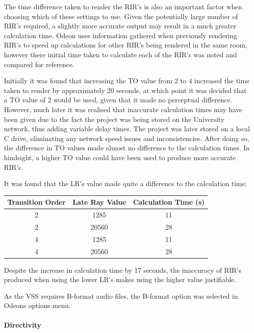 \documentclass[../../main.tex]{subfiles}
\begin{document}
				The time difference taken to render the \ac{RIR}'s is also an important factor when choosing which of these settings to use. Given the potentially large number of \ac{RIR}'s required, a slightly more accurate output may result in a much greater calculation time. Odeon uses information gathered when previously rendering \ac{RIR}'s to speed up calculations for other \ac{RIR}'s being rendered in the same room, however there initial time taken to calculate each of the \ac{RIR}'s was noted and compared for reference.

				Initially it was found that increasing the \ac{TO} value from 2 to 4 increased the time taken to render by approximately 20 seconds, at which point it was decided that a \ac{TO} value of 2 would be used, given that it made no perceptual difference. However, much later it was realised that inaccurate calculation times may have been given due to the fact the project was being stored on the University network, thus adding variable delay times. The project was later stored on a local C drive, eliminating any network speed issues and inconsistencies. After doing so, the difference in \ac{TO} values made almost no difference to the calculation times. In hindsight, a higher \ac{TO} value could have been used to produce more accurate \ac{RIR}'s.

				It was found that the \ac{LR's} value made quite a difference to the calculation time:

				\begin{center}
					\begin{tabular}{c c c}
					\textbf{Transition Order} & \textbf{Late Ray Value} & \textbf{Calculation Time (s)} \\ \hline
					2 & 1285 & 11 \\
					2 & 20560 & 28 \\
					4 & 1285 & 11 \\
					4 & 20560 & 28 \\
					\end{tabular}
				\end{center}

				Despite the increase in calculation time by 17 seconds, the inaccuracy of \ac{RIR}'s produced when using the lower \ac{LR's} makes using the higher value justifiable.

				As the \ac{VSS} requires B-format audio files, the B-format option was selected in Odeons options menu.



			\paragraph{Directivity}
\end{document}
